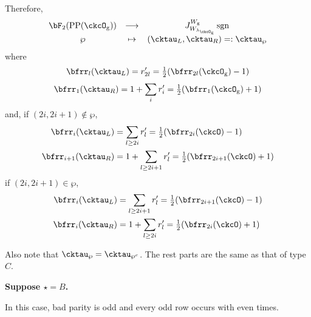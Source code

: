 \documentclass[12pt]{amsart}
\newcommand{\sgn}{\operatorname{sgn}}
\numberwithin{equation}{section}
\theoremstyle{remark}
\def\half{{\tfrac{1}{2}}}
\def\lamckg{\lambda_{\ckcO_{\mathrm g}}}
\def\CPP{\mathrm{PP}}
\begin{document}
{{      Therefore,
      \[
        \begin{array}{ccc}
          \bF_{2}(\CPP(\ckcO_{\mathrm g}))&\longrightarrow
          & J_{W_{\lamckg}}^{W_{\mathrm g}} \sgn \\
          \wp&\mapsto&    (\cktau_{L},\cktau_{R}) =:\cktau_{\wp}
        \end{array}
      \]
      where
      \[
        \bfrr_{l}(\cktau_{L}) = r'_{2l} = \half (\bfrr_{2l}(\ckcO_{\mathrm g})-1)
      \]
      \[
        \bfrr_{1}(\cktau_{R}) = 1+ \sum_{i} r'_{i} = \half (\bfrr_{1}(\ckcO_{\mathrm g})+1)
      \]
      and, if $(2i,2i+1)\notin \wp$,
      \[
        \begin{split}
          \bfrr_{i}(\cktau_{L}) & = \sum_{l\geq 2i} r'_{l}
          = \half(\bfrr_{2i}(\ckcO)-1)\\
          \bfrr_{i+1}(\cktau_{R}) & = 1 + \sum_{l\geq 2i+1} r'_{l} = \half(\bfrr_{2i+1}(\ckcO)+1)
        \end{split}
      \]
      if $(2i,2i+1)\in \wp$,
      \[
        \begin{split}
          \bfrr_{i}(\cktau_{L}) & = \sum_{l\geq 2i+1} r'_{l}
          = \half(\bfrr_{2i+1}(\ckcO)-1)\\
          \bfrr_{i}(\cktau_{R}) & = 1 + \sum_{l\geq 2i} r'_{l} = \half(\bfrr_{2i}(\ckcO)+1)
        \end{split}
      \]

      Also note that $\cktau_{\wp}=\cktau_{\wp^{c}}$. The rest parts are the
      same as that of type $C$.

      {\bf Suppose $\star=B$. }

      In this case, bad parity is odd and every odd row occurs with even
      times.

}}
\end{document}
